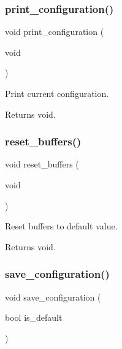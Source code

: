\subsubsection{\texorpdfstring{print\+\_\+configuration()}{print\_configuration()}}
{\footnotesize\ttfamily void print\+\_\+configuration (\begin{DoxyParamCaption}\item[{void}]{ }\end{DoxyParamCaption})}



Print current configuration. 

\begin{DoxyReturn}{Returns}
void. 
\end{DoxyReturn}
\mbox{\label{i2c-rain_8h_a717429168fb5542a7b36a94712f7c67e}} 
\subsubsection{\texorpdfstring{reset\+\_\+buffers()}{reset\_buffers()}}
{\footnotesize\ttfamily void reset\+\_\+buffers (\begin{DoxyParamCaption}\item[{void}]{ }\end{DoxyParamCaption})}



Reset buffers to default value. 

\begin{DoxyReturn}{Returns}
void. 
\end{DoxyReturn}
\mbox{\label{i2c-rain_8h_a8801fa7c9f323c5b8b9b2bb5b1c438ff}} 
\subsubsection{\texorpdfstring{save\+\_\+configuration()}{save\_configuration()}}
{\footnotesize\ttfamily void save\+\_\+configuration (\begin{DoxyParamCaption}\item[{bool}]{is\+\_\+default }\end{DoxyParamCaption})}



